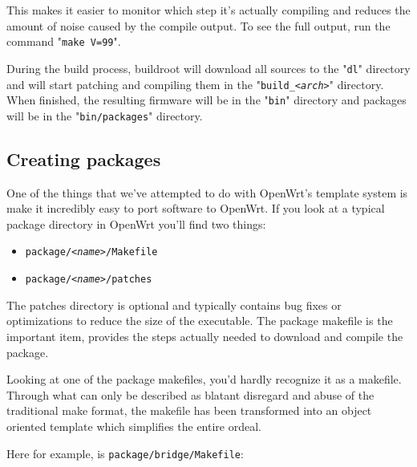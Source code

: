 This makes it easier to monitor which step it's actually compiling and reduces the amount
of noise caused by the compile output. To see the full output, run the command
"\texttt{make V=99}".

During the build process, buildroot will download all sources to the "\texttt{dl}"
directory and will start patching and compiling them in the "\texttt{build\_\textit{<arch>}}"
directory. When finished, the resulting firmware will be in the "\texttt{bin}" directory
and packages will be in the "\texttt{bin/packages}" directory.


\subsection{Creating packages}


One of the things that we've attempted to do with OpenWrt's template system is make it
incredibly easy to port software to OpenWrt. If you look at a typical package directory
in OpenWrt you'll find two things:

\begin{itemize}
    \item \texttt{package/\textit{<name>}/Makefile}
    \item \texttt{package/\textit{<name>}/patches}
\end{itemize}

The patches directory is optional and typically contains bug fixes or optimizations to
reduce the size of the executable. The package makefile is the important item, provides
the steps actually needed to download and compile the package.

Looking at one of the package makefiles, you'd hardly recognize it as a makefile.
Through what can only be described as blatant disregard and abuse of the traditional
make format, the makefile has been transformed into an object oriented template which
simplifies the entire ordeal.

Here for example, is \texttt{package/bridge/Makefile}:

